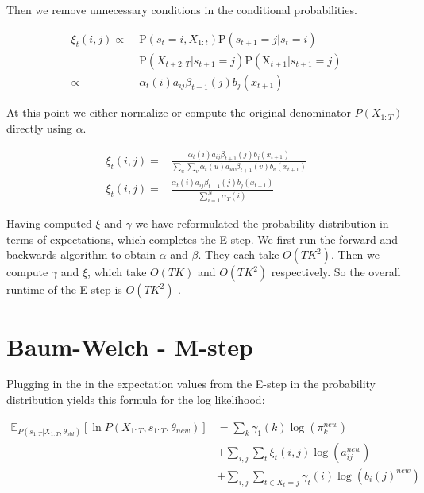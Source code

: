 Then we remove unnecessary conditions in the conditional probabilities.

\begin{equation}
\begin{aligned}
\xi_{t}(i, j) \propto \; &\mathrm{P}\left(s_{t}=i, X_{1: t}\right) \mathrm{P}\left(s_{t+1}=j | s_{t}=i\right) \\
&\mathrm{P}\left(X_{t+2: T} | s_{t+1}=j\right) \mathrm{P}\left(\mathrm{X}_{t+1} | s_{t+1}=j\right) \\
\propto \;  & \alpha_{t}(i) a_{i j} \beta_{t+1}(j) b_{j}(x_{t+1})
\end{aligned} 
\end{equation}

At this point we either normalize or compute the original denominator $P(X_{1:T})$ directly using $\alpha$.

\begin{equation}
\begin{aligned}
\xi_{t}(i, j)=&\frac{\alpha_{t}(i) a_{i j} \beta_{t+1}(j) b_{j}(x_{t+1})}{\sum_{u} \sum_{v} \alpha_{t}(u) a_{u v} \beta_{t+1}(v) b_{v}( x_{t+1})} \\
\xi_{t}(i, j)=&\frac{\alpha_{t}(i) a_{i j} \beta_{t+1}(j) b_{j} (x_{t+1})}{\sum_{i=1}^{N} \alpha_{T}(i)}
\label{eq:xi-def}
\end{aligned}
\end{equation}

Having computed $\xi$ and $\gamma$ we have reformulated the probability distribution in terms of expectations, which completes the E-step. We first run the forward and backwards algorithm to obtain $\alpha$ and $\beta$. They each take $O(TK^2)$. Then we compute $\gamma$ and $\xi$, which take $O(TK)$ and $O(TK^2)$ respectively. So the overall runtime of the E-step is $O(TK^2)$ \parencite{miningmassivedatasets}.

\section{Baum-Welch - M-step}

Plugging in the in the expectation values from the E-step in the probability distribution yields this formula for the log likelihood:

\begin{equation}
\begin{aligned}
\mathbb{E}_{P\left(s_{1: T} | X_{1: T}, \theta_{o l d}\right)}\left[\ln P\left(X_{1: T}, s_{1: T}, \theta_{n e w}\right)\right] &=\sum_{k} \gamma_{1}(k) \log \left(\pi_{k}^{n e w}\right) \\
&+\sum_{i, j} \sum_{t} \xi_{t}(i, j) \log \left(a_{i j}^{n e w}\right) \\
&+\sum_{i, j} \sum_{t \in X_t = j} \gamma_{t}(i)   \log \left(b_{i}(j)^{n e w}\right)
\end{aligned}
\end{equation}

